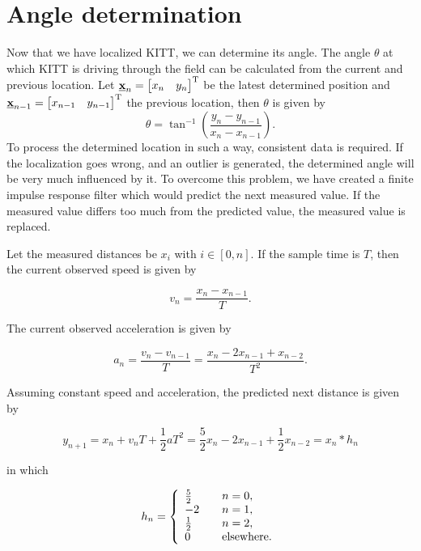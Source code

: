 \documentclass[11pt,titlepage]{report}
\begin{document}
\section{Angle determination}
Now that we have localized KITT, we can determine its angle.
The angle $\theta$ at which KITT is driving through the field can be calculated from the current and previous location. Let $\mathbf{\underline{x}}_n=\begin{bmatrix}x_n & y_n\end{bmatrix}^{\text T}$ be the latest determined position and $\mathbf{\underline{x}}_{n-1}=\begin{bmatrix}x_{n-1} & y_{n-1}\end{bmatrix}^{\text T}$ the previous location, then $\theta$ is given by
\begin{equation}
\theta = \tan^{-1}\left(\frac{y_n-y_{n-1}}{x_n-x_{n-1}}\right).
\end{equation}
To process the determined location in such a way, consistent data is required. If the localization goes wrong, and an outlier is generated, the determined angle will be very much influenced by it. To overcome this problem, we have created a finite impulse response filter which would predict the next measured value. If the measured value differs too much from the predicted value, the measured value is replaced.

Let the measured distances be $x_i$ with $i \in [0,n]$. If the sample time is $T$, then the current observed speed is given by

\begin{equation}
	v_n = \frac{x_{n} - x_{n-1}}{T}.
\end{equation}

The current observed acceleration is given by

\begin{equation}
	a_n = \frac{v_n - v_{n-1}}{T} = \frac{x_{n} - 2 x_{n-1} + x_{n-2}}{T^2}.
\end{equation}

Assuming constant speed and acceleration, the predicted next distance is given by

\begin{equation}
	y_{n+1} = x_{n} + v_n T + \frac{1}{2} a T^2 = \frac{5}{2} x_n - 2 x_{n-1} + \frac{1}{2} x_{n-2}= x_n \ast h_n
\end{equation}

in which

\begin{equation}
	h_n = \left\{
	\begin{array}{l l}
		\frac{5}{2} & \quad n = 0, \\
		-2 & \quad n = 1, \\
		\frac{1}{2} & \quad n = 2, \\
		0 & \quad \text{elsewhere}.
	\end{array}
	\right.
\end{equation}
\end{document}
